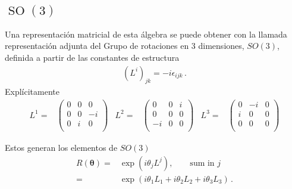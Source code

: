 \subsection{$\operatorname{SO}(3)$}
Una representación matricial de esta álgebra se puede obtener con la llamada representación adjunta del Grupo de rotaciones en 3 dimensiones, $SO(3)$, definida a partir de las constantes de estructura \cite{Veltman}
\begin{align}
  \label{eq:so3adj}
  (L^i)_{jk}=-i\epsilon_{ijk}\,.
\end{align}
Explícitamente
\begin{align*}
  L^1=&
  \begin{pmatrix}
   0 & 0 & 0\\
   0 & 0 & -i\\
   0 & i & 0 \\
  \end{pmatrix}&
 L^2=&
 \begin{pmatrix}
  0 & 0  & i \\ 
  0 & 0  & 0 \\
 -i & 0  & 0 \\
 \end{pmatrix}&
 L^3=&
 \begin{pmatrix}
   0 & -i & 0\\
   i & 0  & 0\\
   0 & 0 & 0\\
 \end{pmatrix}
\end{align*}

Estos generan los elementos de $SO(3)$
\begin{align}
  R(\boldsymbol{\theta})=&\exp(i \theta_j L^{j}),\qquad\text{sum in $j$}\nonumber\\
                 =&\exp(i\theta_1 L_1+i\theta_2 L_2+i\theta_3 L_3)\,.
\end{align}

